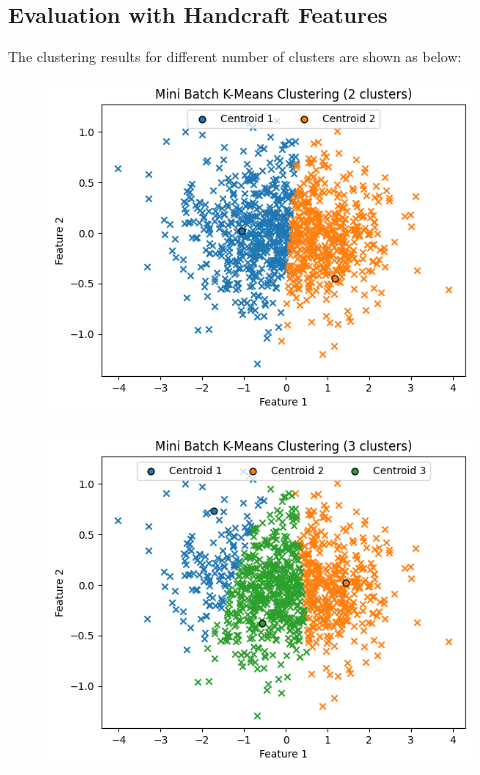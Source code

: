 \documentclass{template}
\begin{document}
\subsection{Evaluation with Handcraft Features}
The clustering results for different number of clusters are shown as below:
\begin{figure}
\includegraphics[scale=0.7]{c1.png}
\caption{}
\label{fig:logo}
\end{figure}
\begin{figure}
\includegraphics[scale=0.7]{C2.png}
\caption{}
\label{fig:logo}
\end{figure}
\end{document}
